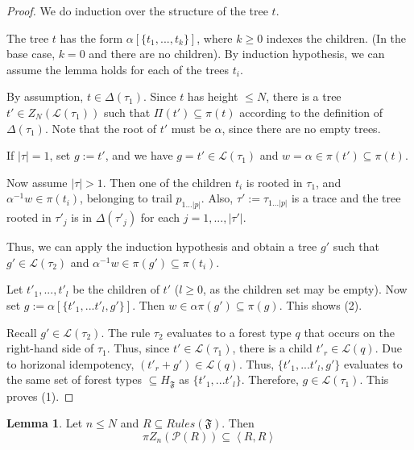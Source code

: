 \documentclass[sigplan,9pt]{acmart}\settopmatter{printfolios=true,printccs=false,printacmref=false}
\newcounter{thm}
\newcounter{theorem}
\theoremstyle{definition}
\newtheorem{llemma}[thm]{Lemma}
\newcommand{\La}[0]{{\mathcal{L}}}
\newcommand{\Ff}[0]{{\mathfrak{F}}}
\newcommand{\Pa}[0]{{\mathcal{P}}}
\newcommand{\Rn}[0]{Z_n}
\begin{document}
\begin{proof}
We do induction over the structure of the tree $t$.

The tree $t$ has the form $\alpha[\{t_1, ..., t_k\}]$, where $k \geq 0$ indexes the children. (In the base case, $k=0$ and there are no children). By induction hypothesis, we can assume the lemma holds for each of the trees $t_i$.

By assumption, $t \in \Delta(\tau_1)$.
Since $t$ has height $\leq N$, there is a tree $t' \in Z_N(\La(\tau_1))$ such that $\Pi(t') \subseteq \pi(t)$ according to the definition of $\Delta(\tau_1)$. Note that the root of $t'$ must be $\alpha$, since there are no empty trees.



If $|\tau| = 1$, set $g := t'$, and we have $g = t' \in \La(\tau_1)$ and $w = \alpha \in \pi(t') \subseteq \pi(t)$.

Now assume $|\tau| > 1$.
Then one of the children $t_i$ is rooted in $\tau_1$, and $\alpha^{-1}w \in \pi(t_i)$, belonging to trail $p_{1\dots|p|}$.
Also, $\tau' := \tau_{1\dots|p|}$ is a trace and the tree rooted in $\tau'_j$ is in $\Delta(\tau'_j)$ for each $j = 1,...,|\tau'|$.

Thus, we can apply the induction hypothesis and obtain a tree $g'$ such that $g' \in \La(\tau_2)$ and $\alpha^{-1}w \in \pi(g') \subseteq \pi(t_i)$.

Let $t'_1, ..., t'_l$ be the children of $t'$ ($l \geq 0$, as the children set may be empty). Now set $g := \alpha[\{t'_1, ... t'_l, g'\}]$.
Then $w \in \alpha\pi(g') \subseteq \pi(g)$. This shows (2).

Recall $g' \in \La(\tau_2)$. The rule $\tau_2$ evaluates to a forest type $q$ that occurs on the right-hand side of $\tau_1$.
Thus, since $t' \in \La(\tau_1)$, there is a child $t'_r \in \La(q)$.
Due to horizonal idempotency, $(t'_r + g') \in \La(q)$.
Thus, $\{t'_1, ... t'_l, g'\}$ evaluates to the same set of forest types $\subseteq H_\Ff$ as $\{t'_1, ... t'_l\}$.
Therefore, $g \in \La(\tau_1)$.
This proves (1).
\end{proof}

\begin{llemma}\label{lemma:up-to-n-pre}
Let $n \leq N$ and $R \subseteq Rules(\Ff)$. Then
$$\pi \Rn (\Pa(R)) \subseteq \left\langle R, R\right\rangle$$

\end{llemma}
\end{document}
